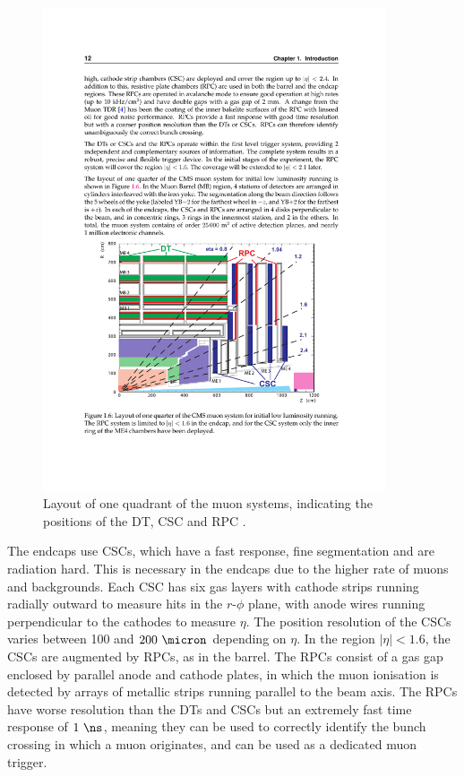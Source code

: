 \begin{figure}[htbp]
   \includegraphics[width=0.9\textwidth]{plots/detector/muon_layout.pdf}
\caption[Layout of one quadrant of the muon systems.]{
    Layout of one quadrant of the muon systems, indicating the positions
of the DT, CSC and RPC \cite{TDR}.}
\label{fig:muondetectors}
\end{figure}

The endcaps use \ac{CSC}s, which have a fast response, fine segmentation and are
radiation hard. This is necessary in the endcaps due to the higher rate of muons
and backgrounds. Each \ac{CSC} has six gas layers with cathode strips running
radially outward to measure hits in the $r$-$\phi$ plane, with anode wires
running perpendicular to the cathodes to measure $\eta$. The position resolution
of the \ac{CSC}s varies between 100 and $200~\micron$ depending on $\eta$. In the region
$|\eta|<1.6$, the \ac{CSC}s are augmented by \ac{RPC}s, as in the barrel. The
\ac{RPC}s consist of a gas gap enclosed by parallel anode and cathode plates, in
which the muon ionisation is detected by arrays of metallic strips running
parallel to the beam axis. The \ac{RPC}s have worse resolution than the \ac{DT}s
and \ac{CSC}s but an extremely fast time response of
$1~\ns$, meaning they can be used to correctly identify the bunch crossing in
which a muon originates, and can be used as a dedicated muon trigger.


